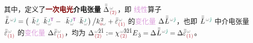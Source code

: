 其中，定义了\textbf{\textcolor{Maroon}{一次电光}\textcolor{PineGreen}{介电张量}} $\bar{\bar{\Delta}}^{\;\! \mathcolor{gray}{\omega} }_{\;\! \textcolor{Maroon}{(2)}}$，即 \textcolor{Plum}{线性}算子 $\xint{\mathcolor{gray}{-}}{30}{\bar{\bar{L}}}^{\;\! \mathcolor{gray}{\omega} \textcolor{PineGreen}{\hat{\jmath}}} = \left( \xint{\begin{smallmatrix} ~ \\ {}^{}_{\mathcolor{gray}{-}} \\ ~ \end{smallmatrix}}{15}{\bar{k}}_{\;\! \mathcolor{gray}{\omega}}^{\;\! \textcolor{PineGreen}{\jmath}} \xint{\begin{smallmatrix} ~ \\ {}^{}_{\mathcolor{gray}{-}} \\ ~ \end{smallmatrix}}{15}{\bar{k}}_{\;\! \mathcolor{gray}{\omega}}^{\;\! \textcolor{PineGreen}{\jmath} {\mathsf{\textcolor{Plum}{T}}}} - \xint{\begin{smallmatrix} ~ \\ {}^{}_{\mathcolor{gray}{-}} \\ ~ \end{smallmatrix}}{15}{\bar{k}}_{\;\! \mathcolor{gray}{\omega}}^{\;\! \textcolor{PineGreen}{\jmath} {\mathsf{\textcolor{Plum}{T}}}} \xint{\begin{smallmatrix} ~ \\ {}^{}_{\mathcolor{gray}{-}} \\ ~ \end{smallmatrix}}{15}{\bar{k}}_{\;\! \mathcolor{gray}{\omega}}^{\;\! \textcolor{PineGreen}{\jmath}} \right) \big/ k_{\textcolor{Maroon}{\mathsf{o}} \mathcolor{gray}{\omega}}^{\;\! 2} + \bar{\bar{\varepsilon}}^{\;\! \mathcolor{gray}{\omega}}_{\textcolor{Maroon}{(1)}}$ 的\textcolor{Plum}{变化量} $\Delta \xint{\mathcolor{gray}{-}}{30}{\bar{\bar{L}}}^{\;\! \mathcolor{gray}{\omega} \textcolor{PineGreen}{\hat{\jmath}}}$，也即 $\xint{\mathcolor{gray}{-}}{30}{\bar{\bar{L}}}^{\;\! \mathcolor{gray}{\omega} \textcolor{PineGreen}{\hat{\jmath}}}$ 中\textcolor{PineGreen}{介电张量} $\bar{\bar{\varepsilon}}^{\;\! \mathcolor{gray}{\omega}}_{\textcolor{Maroon}{(1)}}$ 的\textcolor{Plum}{变化量} $\Delta \bar{\bar{\varepsilon}}^{\;\! \mathcolor{gray}{\omega}}_{\textcolor{Maroon}{(1)}}$，均为 ${\Delta}^{\;\! \mathcolor{gray}{\omega} \hat{2} \hat{1} }_{\;\! \textcolor{Maroon}{(2)} } := {\chi}^{\;\! \mathcolor{gray}{\omega} \hat{3} \hat{2} \hat{1} }_{\;\! \textcolor{Maroon}{(2)} } {E}_{\;\! \hat{3} } = \Delta \xint{\mathcolor{gray}{-}}{30}{\bar{\bar{L}}}^{\;\! \mathcolor{gray}{\omega} \textcolor{PineGreen}{\hat{\jmath}}} = \Delta \bar{\bar{\varepsilon}}^{\;\! \mathcolor{gray}{\omega}}_{\textcolor{Maroon}{(1)}}$。

